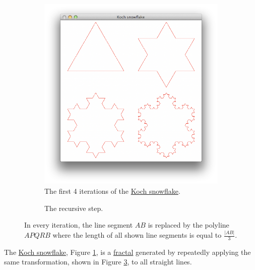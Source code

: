 \documentclass[addpoints]{exam}
\begin{document}
\begin{questions}
  \begin{figure}
    \centering
  \begin{subfigure}[b]{.45\linewidth}
    \includegraphics[width=\textwidth]{koch1}
    \caption{The first 4 iterations of the \href{https://en.wikipedia.org/wiki/Koch_snowflake}{Koch snowflake}.}
    \label{fig:koch1}
  \end{subfigure}
  \begin{subfigure}[b]{.45\linewidth}
    \caption{The recursive step.}
    \label{fig:koch2}
  \end{subfigure}
  \caption{In every iteration, the line segment $AB$ is replaced by the polyline $APQRB$ where the length of all shown line segments is equal to $\frac{|AB|}{3}$.}
\end{figure}

The \href{https://en.wikipedia.org/wiki/Koch_snowflake}{Koch snowflake}, Figure \ref{fig:koch1}, is a \href{http://mathworld.wolfram.com/Fractal.html}{fractal} generated by repeatedly applying the same transformation,
shown in Figure \ref{fig:koch2}, to all straight lines.
\begin{parts}

\end{parts}
\end{questions}
\end{document}

